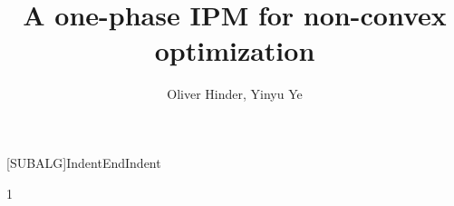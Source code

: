 \documentclass{article}
\begin{document}
\title{A one-phase IPM for non-convex optimization}
\author{Oliver Hinder, Yinyu Ye}

[SUBALG]{Indent}{EndIndent}{}{\algorithmicend\ }%

\maketitle

\def\inProgress{0}

\if\inProgress1
\newcommand{\inProgressHide}[1]{} %
\newcommand{\yinyu}[1]{}
\newcommand{\hinder}[1]{}
\else
\newcommand{\inProgressHide}[1]{#1} %
\newcommand{\yinyu}[1]{{\color{red} Yinyu: #1}}
\newcommand{\hinder}[1]{{\color{red}{Hinder: #1}}}
\fi



\newcommand{\algorithmicbreak}{\textbf{break}}
\newcommand{\obj}{f}
\newcommand{\cons}{a}
\newcommand{\hess}{\grad^2}
\newcommand{\nvar}{n}
\newcommand{\ncon}{m}

\newcommand{\eye}{I}





\newcommand{\parNumCor}{j_{\max}}
\newcommand{\parNumCorValue}{2}



\newcommand{\parComp}{\beta_{1}}
\newcommand{\parCompValue}{0.01}
\newcommand{\parCompInterval}{(0,1)}

\newcommand{\parCompAgg}{\beta_{2}}
\newcommand{\parCompAggValue}{0.02}
\newcommand{\parCompAggInterval}{(\parComp,1)}

\newcommand{\parMinStableStepSize}{\beta_{3}}
\newcommand{\parMinStableStepSizeValue}{2^{-5}}
\newcommand{\parMinStableStepSizeInterval}{(0,1)}

\newcommand{\parKKTReductFactor}{\beta_{4}}
\newcommand{\parKKTReductFactorValue}{0.01}
\newcommand{\parKKTReductFactorInterval}{(0,1)}

\newcommand{\parObjReductFactor}{\beta_{5}}
\newcommand{\parObjReductFactorValue}{0.2}
\newcommand{\parObjReductFactorInterval}{(0,1)}

\newcommand{\parBacktracking}{\beta_{6}}
\newcommand{\parBacktrackingValue}{0.5}
\newcommand{\parBacktrackingInterval}{(0,1)}

\newcommand{\parFracBoundary}{\beta_{7}}
\newcommand{\parFracBoundaryValue}{0.1}
\newcommand{\parFracBoundaryInterval}{(0,1)}
\end{document}
